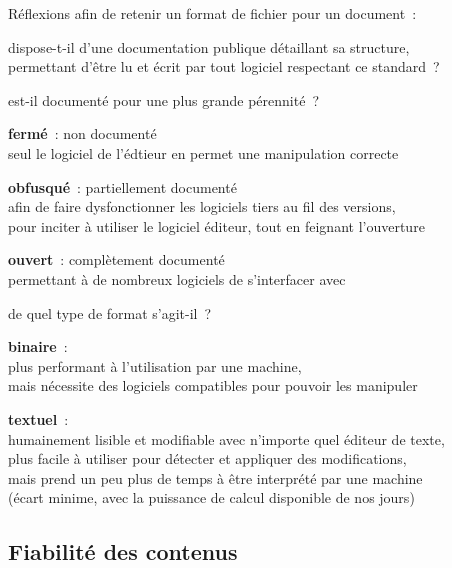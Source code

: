 Réflexions afin de retenir un format de fichier pour un document :
\begin{itmz}
\item{dispose-t-il d’une documentation publique détaillant sa structure,\\
permettant d’être lu et écrit par tout logiciel respectant ce standard ?}
\item{est-il documenté pour une plus grande pérennité ?
    \begin{itmz}
    \item{\textbf{fermé} : non documenté\\
    seul le logiciel de l’édtieur en permet une manipulation correcte}
    \item{\textbf{obfusqué} : partiellement documenté\\
    afin de faire dysfonctionner les logiciels tiers au fil des versions,\\
    pour inciter à utiliser le logiciel éditeur, tout en feignant l’ouverture}
    \item{\textbf{ouvert} : complètement documenté\\
    permettant à de nombreux logiciels de s’interfacer avec}
    \end{itmz}
}
\item{de quel type de format s’agit-il ?
    \begin{itmz}
    \item{\textbf{binaire} :\\
    plus performant à l’utilisation par une machine,\\
    mais nécessite des logiciels compatibles pour pouvoir les manipuler
    }
    \item{\textbf{textuel} :\\
    humainement lisible et modifiable avec n’importe quel éditeur de texte,\\
    plus facile à utiliser pour détecter et appliquer des modifications,\\
    mais prend un peu plus de temps à être interprété par une machine\\
    (écart minime, avec la puissance de calcul disponible de nos jours)
    }
    \end{itmz}
}
\end{itmz}

\hr

\subsection{Fiabilité des contenus}

